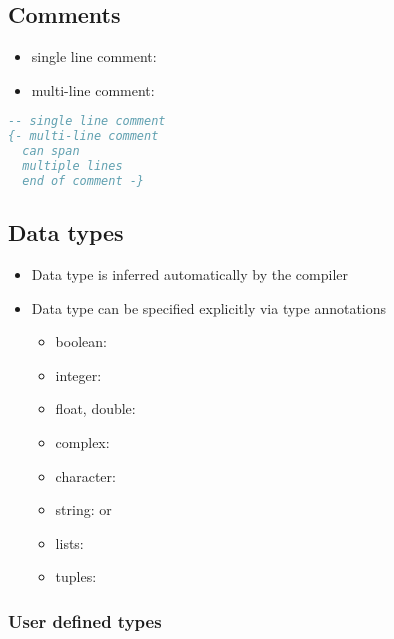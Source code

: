\documentclass[a4paper,landscape,10pt]{article}
\begin{document}
\begin{multicols*}{2}

  \subsection{Comments}

  \begin{itemize}
    \item single line comment: \ihaskell{--}
    \item multi-line comment: 

  \end{itemize}

  \begin{lstlisting}[language=Haskell]
-- single line comment
{- multi-line comment
  can span
  multiple lines
  end of comment -}
\end{lstlisting}

  \subsection{Data types}

  \begin{itemize}
    \item Data type is inferred automatically by the compiler
    \item Data type can be specified explicitly via type annotations \ihaskell{::}
          \begin{itemize}
            \item boolean: 
            \item integer: 
            \item float, double: 
            \item complex: 
            \item character: 
            \item string: \ihaskell{["a", "b", "c"]} or 
            \item lists: \ihaskell{[1, 2, 3]}
            \item tuples: 
          \end{itemize}
  \end{itemize}

  \subsubsection{User defined types}


\end{multicols*}
\end{document}
